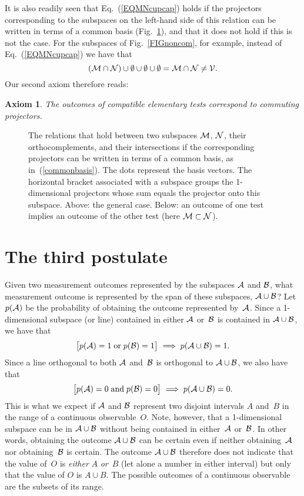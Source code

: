 \documentclass[12pt]{article}
\newtheorem{axiom}{Axiom}
\newcommand{\bax}{\begin{axiom}}
\newcommand{\eax}{\end{axiom}}
\newcommand{\be}{\begin{equation}}
\newcommand{\ee}{\end{equation}}
\newcommand{\cA}{{\cal A}}
\newcommand{\cB}{{\cal B}}
\newcommand{\cM}{{\cal M}}
\newcommand{\cN}{{\cal N}}
\newcommand{\cV}{{\cal V}}
\begin{document}
It is also readily seen that Eq.~(\ref{EQMNcupcap}) holds if the projectors corresponding to the subspaces on the left-hand side of this relation can be written in terms of a common basis (Fig.~\ref{FIGcompro}), and that it does not hold if this is not the case. For the subspaces of Fig.~\ref{FIGnoncom}, for example, instead of Eq.~(\ref{EQMNcupcap}) we have that
\be
(\cM\cap\cN)\cup\emptyset\cup\emptyset\cup\emptyset=\cM\cap\cN\neq\cV.
\ee
Our second axiom therefore reads:
\bax
The outcomes of compatible elementary tests correspond to commuting projectors.
\label{AXcomcom}
\eax
\begin{figure}[t]
\begin{center}
\end{center}
\caption{The relations that hold between two subspaces $\cM$, $\cN$, their orthocomplements, and their intersections if the corresponding projectors can be written in terms of a common basis, as in~(\ref{commonbasis}). The dots represent the basis vectors. The horizontal bracket associated with a subspace groups the 1-dimensional projectors whose sum equals the projector onto this subspace. Above: the general case. Below: an outcome of one test implies an outcome of the other test (here $\cM\subset\cN$).}
\label{FIGcompro}
\end{figure}

\section{The third postulate}
Given two measurement outcomes represented by the subspaces $\cA$ and $\cB$, what measurement outcome is represented by the span of these subspaces, $\cA\cup\cB$?  Let $p(\cA)$ be the probability of obtaining the outcome represented by~$\cA$. Since a 1-dimensional subspace (or line) contained in either $\cA$ or~$\cB$ is contained in $\cA\cup\cB$, we have that
\be
\bigl[p(\cA)=1\;\hbox{or}\;p(\cB)=1\bigr]\;\Longrightarrow\;p(\cA\cup\cB)=1.
\ee
Since a line orthogonal to both $\cA$ and~$\cB$ is orthogonal to $\cA\cup\cB$, we also have that
\be
\bigl[p(\cA)=0\;\hbox{and}\;p(\cB)=0\bigr]\;\Longrightarrow\;p(\cA\cup\cB)=0.
\ee
This is what we expect if $\cA$ and $\cB$ represent two disjoint intervals $A$ and~$B$ in the range of a continuous observable~$O$. Note, however, that a 1-dimensional subspace can be in $\cA\cup\cB$ without being contained in either~$\cA$ or~$\cB$. In other words, obtaining the outcome $\cA\cup\cB$ can be certain even if neither obtaining~$\cA$ nor obtaining~$\cB$ is certain. The outcome $\cA\cup\cB$ therefore does not indicate that the value of~$O$ is \textit{either} $A$ \textit{or}~$B$ (let alone a number in either interval) but only that the value of $O$ is $A\cup B$. The possible outcomes of a continuous observable are the subsets of its range.
\end{document}
